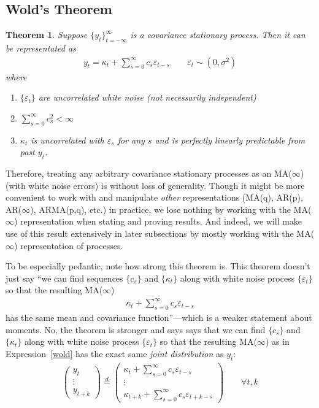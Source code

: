 \documentclass[12pt]{article}
\theoremstyle{plain}
\newtheorem{thm}{Theorem}[section]
\theoremstyle{definition}
\theoremstyle{remark}
\begin{document}
\clearpage
\subsection{Wold's Theorem}

\begin{thm}
Suppose $\{y_t\}_{t=-\infty}^\infty$ is a covariance stationary process.
Then it can be representated as
\begin{align*}
  y_t = \kappa_t + \sum_{s=0}^\infty c_s \varepsilon_{t-s}
  \qquad \varepsilon_t\sim(0,\sigma^2)
\end{align*}
where
\begin{enumerate}[label=(\roman*)]
  \item $\{\varepsilon_t\}$ are uncorrelated white noise (not
    necessarily independent)
  \item $\sum_{s=0}^\infty c_s^2<\infty$
  \item $\kappa_t$ is uncorrelated with $\varepsilon_{s}$ for any $s$
    and is perfectly linearly predictable from past $y_t$.
\end{enumerate}
\end{thm}
Therefore, treating any arbitrary covariance stationary processes as an
MA($\infty$) (with white noise errors) is without loss of generality.
Though it might be more convenient to work with and manipulate
\emph{other} representations (MA(q), AR(p), AR($\infty$), ARMA(p,q),
etc.) in practice, we lose nothing by working with the MA($\infty$)
representation when stating and proving results. And indeed, we will
make use of this result extensively in later subsections by mostly
working with the MA($\infty$) representation of processes.

To be especially pedantic, note how strong this theorem is. This theorem
doesn't just say ``we can find sequences $\{c_s\}$ and $\{\kappa_t\}$
along with white noise process $\{\varepsilon_t\}$ so that the resulting
MA($\infty$)
\begin{align}
  \kappa_t + \sum_{s=0}^\infty c_s \varepsilon_{t-s}
  \label{wold}
\end{align}
has the same mean and covariance function''---which
is a weaker statement about moments. No, the theorem is stronger and
says says that we can find $\{c_s\}$ and $\{\kappa_t\}$
along with white noise process $\{\varepsilon_t\}$ so that the resulting
MA($\infty$) as in Expression~\ref{wold} has the exact same
\emph{joint distribution} as $y_t$:
\begin{align*}
  \begin{pmatrix}
    y_t \\ \vdots \\ y_{t+k}
  \end{pmatrix}
  \overset{d}{=}
  \begin{pmatrix}
    \kappa_t + \sum_{s=0}^\infty c_s \varepsilon_{t-s}
    \\ \vdots \\
    \kappa_{t+k} + \sum_{s=0}^\infty c_s \varepsilon_{t+k-s}
  \end{pmatrix}
  \qquad \forall t,k
\end{align*}
\end{document}
